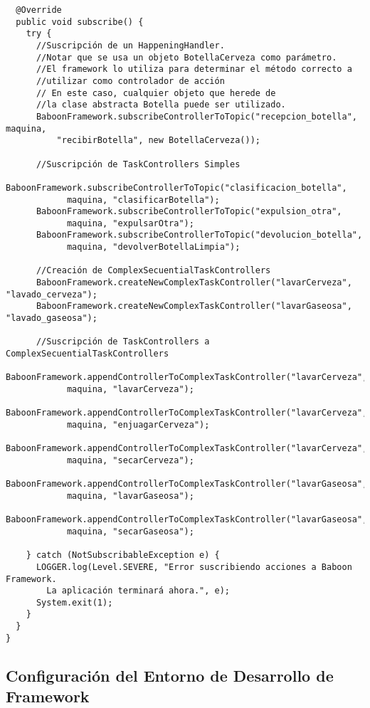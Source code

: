 \begin{verbatim}
  @Override
  public void subscribe() {
    try {
      //Suscripción de un HappeningHandler.
      //Notar que se usa un objeto BotellaCerveza como parámetro.
      //El framework lo utiliza para determinar el método correcto a
      //utilizar como controlador de acción
      // En este caso, cualquier objeto que herede de
      //la clase abstracta Botella puede ser utilizado.
      BaboonFramework.subscribeControllerToTopic("recepcion_botella", maquina,
          "recibirBotella", new BotellaCerveza());

      //Suscripción de TaskControllers Simples
      BaboonFramework.subscribeControllerToTopic("clasificacion_botella", 
            maquina, "clasificarBotella");
      BaboonFramework.subscribeControllerToTopic("expulsion_otra", 
            maquina, "expulsarOtra");
      BaboonFramework.subscribeControllerToTopic("devolucion_botella", 
            maquina, "devolverBotellaLimpia");

      //Creación de ComplexSecuentialTaskControllers
      BaboonFramework.createNewComplexTaskController("lavarCerveza", "lavado_cerveza");
      BaboonFramework.createNewComplexTaskController("lavarGaseosa", "lavado_gaseosa");

      //Suscripción de TaskControllers a ComplexSecuentialTaskControllers
      BaboonFramework.appendControllerToComplexTaskController("lavarCerveza", 
            maquina, "lavarCerveza");
      BaboonFramework.appendControllerToComplexTaskController("lavarCerveza", 
            maquina, "enjuagarCerveza");
      BaboonFramework.appendControllerToComplexTaskController("lavarCerveza", 
            maquina, "secarCerveza");
      BaboonFramework.appendControllerToComplexTaskController("lavarGaseosa", 
            maquina, "lavarGaseosa");
      BaboonFramework.appendControllerToComplexTaskController("lavarGaseosa",
            maquina, "secarGaseosa");

    } catch (NotSubscribableException e) {
      LOGGER.log(Level.SEVERE, "Error suscribiendo acciones a Baboon Framework.
        La aplicación terminará ahora.", e);
      System.exit(1);
    }
  }
}
\end{verbatim}

\subsection {Configuración del Entorno de Desarrollo de \nombreFramework
Framework}
\label{config_baboon_env}

